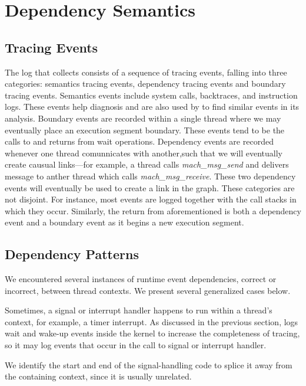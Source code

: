 \section{Dependency Semantics}
\label{sec:dependency-semantics}
\subsection{Tracing Events}
The log that \xxx collects consists of a sequence of tracing events, falling into
three categories: semantics tracing events, dependency tracing events and
boundary tracing events.  Semantics events include system calls, backtraces,
and instruction logs.  These events help diagnosis and are also used by \xxx to
find similar events in its analysis.  Boundary events are recorded within a
single thread where we may eventually place an execution segment boundary.
These events tend to be the calls to and returns from wait operations.
Dependency events are recorded whenever one thread comunnicates with
another,such that we will eventually create causual links---for example, a
thread calls \textit{mach\_msg\_send} and delivers message to anther thread
which calls \textit{mach\_msg\_receive}. These two dependency events will
eventually be used to create a link in the graph.  These categories are not
disjoint.  For instance, most events are logged together with the call stacks
in which they occur.  Similarly, the return from aforementioned
 is both a dependency event and a boundary event as it
begins a new execution segment.

\subsection{Dependency Patterns}
\label{sec:patterns}
We encountered several instances of runtime event dependencies, correct or
incorrect, between thread contexts. We present several generalized cases
below.


Sometimes, a signal or interrupt handler happens to run within a thread's
context, for example, a timer interrupt.  As discussed in the previous section,
\xxx logs wait and wake-up events inside the kernel to increase the
completeness of tracing, so it may log events that occur in the call to signal
or interrupt handler.

We identify the start and end of the signal-handling code to splice it away
from the containing context, since it is usually unrelated.

